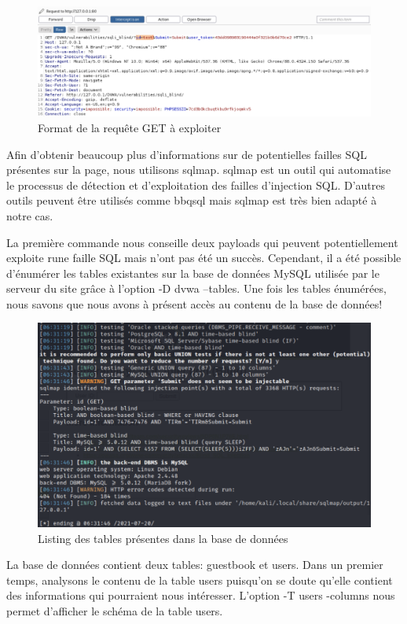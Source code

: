\documentclass[12pt, oneside]{article}
\begin{document}
\begin{figure}[H]
\centering
\includegraphics[scale=0.4]{3}
\caption{Format de la requête GET à exploiter}
\end{figure}

Afin d'obtenir beaucoup plus d'informations sur de potentielles failles SQL présentes sur la page, nous utilisons sqlmap. 
sqlmap est un outil qui automatise le processus de détection et d'exploitation des failles d'injection SQL. D'autres outils peuvent être utilisés comme bbqsql mais sqlmap est très bien adapté à notre cas.

La première commande nous conseille deux payloads qui peuvent potentiellement exploite rune faille SQL mais n'ont pas été un succès.
Cependant, il a été possible d'énumérer les tables existantes sur la base de données MySQL utilisée par le serveur du site grâce à l'option -D dvwa –tables. Une fois les tables énumérées, nous savons que nous avons à présent accès au contenu de la base de données! 

\begin{figure}[H]
\centering
\includegraphics[scale=0.4]{4}
\caption{Listing des tables présentes dans la base de données}
\end{figure}

La base de données contient deux tables: guestbook et users. Dans un premier temps, analysons le contenu de la table users puisqu'on se doute qu'elle contient des informations qui pourraient nous intéresser. L'option -T users -columns nous permet d'afficher le schéma de la table users.
\end{document}
